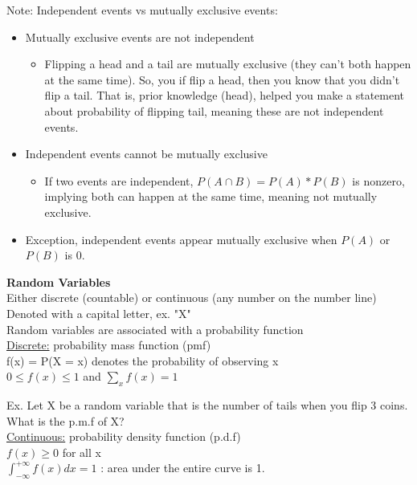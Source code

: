 \documentclass[12pt]{article}
\begin{document}
\noindent Note: Independent events vs mutually exclusive events:
\begin{itemize}
	\item Mutually exclusive events are not independent
	\begin{itemize}
		\item Flipping a head and a tail are mutually exclusive (they can't both happen at the same time). So, you if flip a head, then you know that you didn't flip a tail. That is, prior knowledge (head), helped you make a statement about probability of flipping tail, meaning these are not independent events. 
	\end{itemize}
	\item Independent events cannot be mutually exclusive
		\begin{itemize}
		\item If two events are independent, $P(A \cap B) = P(A)*P(B)$ is nonzero, implying both can happen at the same time, meaning not mutually exclusive. 
	\end{itemize}
\item Exception, independent events appear mutually exclusive when $P(A)$ or $P(B)$ is $0$. \\
\end{itemize}

\noindent \textbf{Random Variables}\\
Either discrete (countable) or continuous (any number on the number line)\\
Denoted with a capital letter, ex. "X"\\

\noindent Random variables are associated with a probability function\\
\underline{Discrete:} probability mass function (pmf)\\

f(x) = P(X = x) denotes the probability of observing x \\

$ 0 \leq f(x) \leq 1$ and $\sum_x f(x) = 1$

Ex. Let X be a random variable that is the number of tails when you flip 3 coins. What is the p.m.f of X?\\

\noindent \underline{Continuous:} probability density function (p.d.f) \\

$f(x) \geq 0$ for all x\\

$\int_{-\infty}^{+\infty} f(x) dx = 1$ : area under the entire curve is 1.\\
\end{document}
